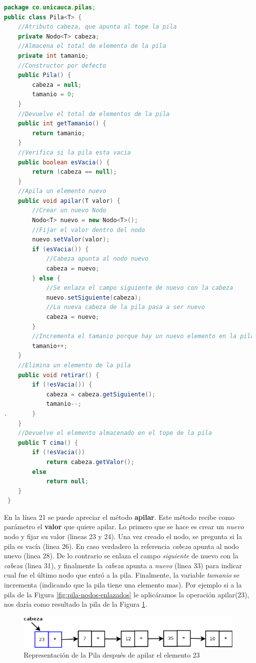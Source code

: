 \begin{lstlisting}[language=Java]
package co.unicauca.pilas;
public class Pila<T> {
    //Atributo cabeza, que apunta al tope la pila
 	private Nodo<T> cabeza;
 	//Almacena el total de elemento de la pila
 	private int tamanio;
    //Constructor por defecto
 	public Pila() {
 		cabeza = null;
 		tamanio = 0;
 	}
	//Devuelve el total de elementos de la pila
 	public int getTamanio() {
 		return tamanio;
 	}
	//Verifica si la pila esta vacia
 	public boolean esVacia() {
 		return (cabeza == null);
 	}
	//Apila un elemento nuevo
 	public void apilar(T valor) {
	 	//Crear un nuevo Nodo
 		Nodo<T> nuevo = new Nodo<T>();
	 	//Fijar el valor dentro del nodo
 		nuevo.setValor(valor);
 		if (esVacia()) {
	 		//Cabeza apunta al nodo nuevo
 			cabeza = nuevo;
 		} else {
	 		//Se enlaza el campo siguiente de nuevo con la cabeza
 			nuevo.setSiguiente(cabeza);
 			//La nueva cabeza de la pila pasa a ser nuevo
 			cabeza = nuevo;
 		}
 		//Incrementa el tamanio porque hay un nuevo elemento en la pila
 		tamanio++;
 	}
	//Elimina un elemento de la pila
 	public void retirar() {
 		if (!esVacia()) {
 			cabeza = cabeza.getSiguiente();
 			tamanio--;
. 		}
 	}
	//Devuelve el elemento almacenado en el tope de la pila
 	public T cima() {
 		if (!esVacia())
 			return cabeza.getValor();
 		else
 			return null;
 	}
 }
\end{lstlisting}

En la línea 21 se puede apreciar el método \textbf{apilar}. Este método recibe como parámetro el \textbf{valor} que quiere apilar. Lo primero que se hace es crear un \textit{nuevo} nodo y fijar su valor (lineas 23 y 24). Una vez creado el nodo, se pregunta si la pila es vacía (linea 26). En caso verdadero la referencia \textit{cabeza} apunta al nodo nuevo (linea 28). De lo contrario se enlaza el campo \textit{siguiente} de nuevo con la \textit{cabeza} (linea 31), y finalmente la \textit{cabeza} apunta a \textit{nuevo} (linea 33) para indicar cual fue el último nodo que entró a la pila. Finalmente, la variable \textit{tamanio} se incrementa (indicando que la pila tiene una elemento mas). Por ejemplo si a la pila de la Figura \ref{fig:pila-nodos-enlazados} le aplicáramos la operación apilar(23), nos daría como resultado la pila de la Figura \ref{fig:pila-nodos-enlazados-apilar}.

\begin{figure}
	\centering
	\includegraphics[scale=0.7]{Diagramas/RepresentacionPilaNodosEnlazadosApilar}
	\caption{Representación de la Pila después de apilar el elemento 23}	
	\label{fig:pila-nodos-enlazados-apilar}
\end{figure}

